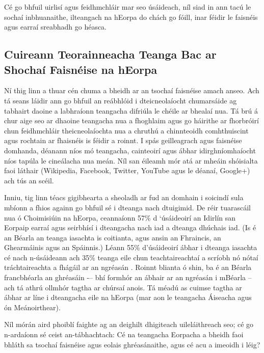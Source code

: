 \documentclass[]{../../metanetpaper}
\begin{document}
\begin{multicols}{2}
Cé go bhfuil uirlisí agus feidhmchláir mar seo úsáideach, níl siad in ann tacú le sochaí inbhuanaithe, ilteangach na hEorpa do chách go fóill, inar féidir le faisnéis agus earraí sreabhadh go héasca.

\subsection{Cuireann Teorainneacha Teanga Bac ar Shochaí Faisnéise na hEorpa}
  
Ní thig linn a thuar cén chuma a bheidh ar an tsochaí faisnéise amach anseo. Ach tá seans láidir ann go bhfuil an reábhlóid i dteicneolaíocht chumarsáide ag tabhairt daoine a labhraíonn teangacha difriúla le chéile ar bhealaí nua. Tá brú á chur aige seo ar dhaoine teangacha nua a fhoghlaim agus go háirithe ar fhorbróirí chun feidhmchláir theicneolaíochta nua a chruthú a chinnteoidh comhthuiscint agus rochtain ar fhaisnéis is féidir a roinnt. I spás geilleagrach agus faisnéise domhanda, déanann níos mó teangacha, cainteoirí agus ábhar idirghníomhaíocht níos tapúla le cineálacha nua meán. Níl san éileamh mór atá ar mheáin shóisialta faoi láthair (Wikipedia, Facebook, Twitter, YouTube agus le déanaí, Google+) ach tús an scéil.


Inniu, tig linn téacs gigibhearta a sheoladh ar fud an domhain i soicindí sula mbíonn a fhios againn go bhfuil sé i dteanga nach dtuigimid. De réir tuarascáil nua ó Choimisiúin na hEorpa, ceannaíonn 57\% d ‘úsáideoirí an Idirlín san Eorpaip earraí agus seirbhísí i dteangacha nach iad a dteanga dhúchais iad. (Is é an Béarla an teanga iasachta is coitianta, agus ansin an Fhraincis, an Ghearmáinis agus an Spáinnis.) Léann 55\% d'úsáideoirí ábhar i dteanga iasachta cé nach n-úsáideann ach 35\% teanga eile chun teachtaireachtaí a scríobh nó nótaí tráchtaireachta a fhágáil ar an ngréasán \cite{EC1}.  Roinnt blianta ó shin, ba é an Béarla francbhéarla an ghréasáin -– bhí formhór an ábhair ar an ngréasán i mBéarla – ach tá athrú ollmhór tagtha ar chúrsaí anois. Tá méadú as cuimse tagtha ar ábhar ar líne i dteangacha eile na hEorpa (mar aon le teangacha Áiseacha agus ón Meánoirthear).

Níl mórán aird phoiblí faighte ag an deighilt dhigiteach uileláithreach seo; cé go n-ardaíonn sé ceist an-tábhachtach: Cé na teangacha Eorpacha a bheidh faoi bhláth sa tsochaí faisnéise agus eolais ghréasánaithe, agus cé acu a imeoidh i léig?


\end{multicols}
\end{document}
